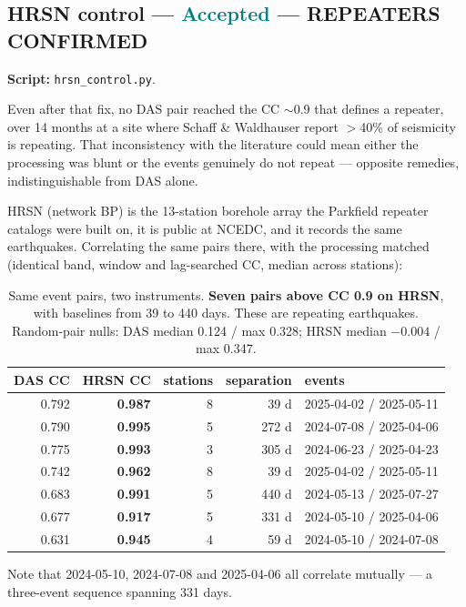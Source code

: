 \documentclass[11pt]{article}
\newcommand{\accepted}{\textcolor{teal}{\textbf{Accepted}}}
\begin{document}
\subsection{HRSN control --- \accepted{} --- REPEATERS CONFIRMED}

\textbf{Script:} \texttt{hrsn\_control.py}.

Even after that fix, no DAS pair reached the CC $\sim$0.9 that defines a
repeater, over 14 months at a site where Schaff \& Waldhauser report $>$40\% of
seismicity is repeating. That inconsistency with the literature could mean either
the processing was blunt or the events genuinely do not repeat --- opposite
remedies, indistinguishable from DAS alone.

HRSN (network BP) is the 13-station borehole array the Parkfield repeater
catalogs were built on, it is public at NCEDC, and it records the same
earthquakes. Correlating the same pairs there, with the processing matched
(identical band, window and lag-searched CC, median across stations):

\begin{table}[H]
\centering
\begin{tabular}{rrrrl}
\toprule
DAS CC & \textbf{HRSN CC} & stations & separation & events \\
\midrule
0.792 & \textbf{0.987} & 8 & 39 d   & 2025-04-02 / 2025-05-11 \\
0.790 & \textbf{0.995} & 5 & 272 d  & 2024-07-08 / 2025-04-06 \\
0.775 & \textbf{0.993} & 3 & 305 d  & 2024-06-23 / 2025-04-23 \\
0.742 & \textbf{0.962} & 8 & 39 d   & 2025-04-02 / 2025-05-11 \\
0.683 & \textbf{0.991} & 5 & 440 d  & 2024-05-13 / 2025-07-27 \\
0.677 & \textbf{0.917} & 5 & 331 d  & 2024-05-10 / 2025-04-06 \\
0.631 & \textbf{0.945} & 4 & 59 d   & 2024-05-10 / 2024-07-08 \\
\bottomrule
\end{tabular}
\caption{Same event pairs, two instruments. \textbf{Seven pairs above CC 0.9 on
HRSN}, with baselines from 39 to 440 days. These are repeating earthquakes.
Random-pair nulls: DAS median 0.124 / max 0.328; HRSN median $-0.004$ / max
0.347.}
\end{table}

Note that 2024-05-10, 2024-07-08 and 2025-04-06 all correlate mutually --- a
three-event sequence spanning 331 days.
\end{document}
